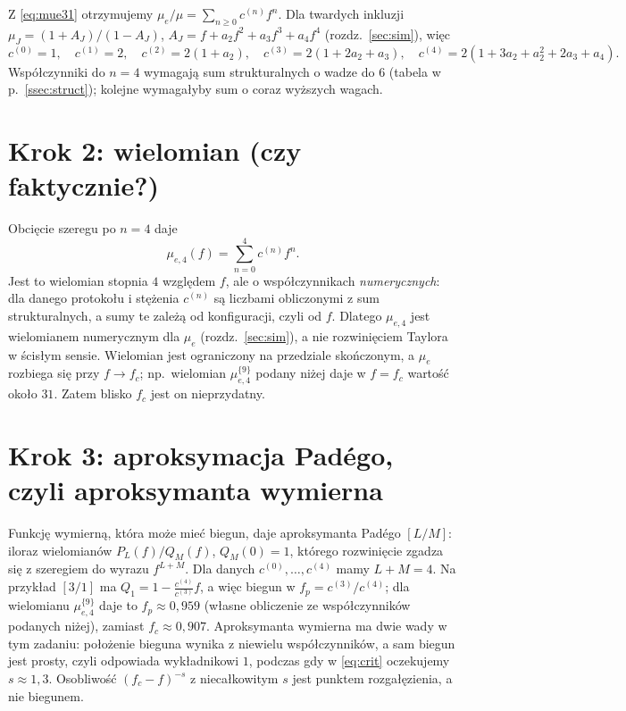 \documentclass[12pt,a4paper,twoside,openright]{report}
\theoremstyle{definition}
\theoremstyle{remark}
\begin{document}
Z \eqref{eq:mue31} otrzymujemy $\mu_e/\mu=\sum_{n\ge0}c^{(n)}f^n$. Dla twardych inkluzji $\mu_J=(1+A_J)/(1-A_J)$, $A_J=f+a_2f^2+a_3f^3+a_4f^4$ (rozdz.~\ref{sec:sim}), więc
\begin{equation*}
{c^{(0)}=1,\quad c^{(1)}=2,\quad c^{(2)}=2(1+a_2),\quad c^{(3)}=2(1+2a_2+a_3),\quad c^{(4)}=2(1+3a_2+a_2^2+2a_3+a_4).}
\end{equation*}
Współczynniki do $n=4$ wymagają sum strukturalnych o wadze do $6$ (tabela w p.~\ref{ssec:struct}); kolejne wymagałyby sum o coraz wyższych wagach.

\section{\texorpdfstring{Krok 2: wielomian (czy faktycznie?)}{Krok 2: wielomian (czy faktycznie?)}}

Obcięcie szeregu po $n=4$ daje
\begin{equation*}
{\mu_{e,4}(f)=\sum_{n=0}^{4}c^{(n)}f^n.}
\end{equation*}
Jest to wielomian stopnia $4$ względem $f$, ale o współczynnikach \emph{numerycznych}: dla danego protokołu i stężenia $c^{(n)}$ są liczbami obliczonymi z sum strukturalnych, a sumy te zależą od konfiguracji, czyli od $f$. Dlatego $\mu_{e,4}$ jest wielomianem numerycznym dla $\mu_e$ (rozdz.~\ref{sec:sim}), a nie rozwinięciem Taylora w ścisłym sensie. Wielomian jest ograniczony na przedziale skończonym, a $\mu_e$ rozbiega się przy $f\to f_c$; np.\ wielomian $\mu^{\{9\}}_{e,4}$ podany niżej daje w $f=f_c$ wartość około $31$. Zatem blisko $f_c$ jest on nieprzydatny.

\section{\texorpdfstring{Krok 3: aproksymacja Padégo, czyli aproksymanta wymierna}{Krok 3: aproksymacja Padégo, czyli aproksymanta wymierna}}

Funkcję wymierną, która może mieć biegun, daje aproksymanta Padégo $[L/M]$: iloraz wielomianów $P_L(f)/Q_M(f)$, $Q_M(0)=1$, którego rozwinięcie zgadza się z szeregiem do wyrazu $f^{L+M}$. Dla danych $c^{(0)},\dots,c^{(4)}$ mamy $L+M=4$. Na przykład $[3/1]$ ma $Q_1=1-\frac{c^{(4)}}{c^{(3)}}f$, a więc biegun w $f_p=c^{(3)}/c^{(4)}$; dla wielomianu $\mu^{\{9\}}_{e,4}$ daje to $f_p\approx0{,}959$ (własne obliczenie ze współczynników podanych niżej), zamiast $f_c\approx0{,}907$. Aproksymanta wymierna ma dwie wady w tym zadaniu: położenie bieguna wynika z niewielu współczynników, a sam biegun jest prosty, czyli odpowiada wykładnikowi $1$, podczas gdy w \eqref{eq:crit} oczekujemy $s\approx1{,}3$. Osobliwość $(f_c-f)^{-s}$ z niecałkowitym $s$ jest punktem rozgałęzienia, a nie biegunem.
\end{document}
